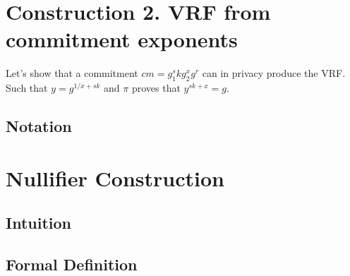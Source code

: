 \section{Construction 2. VRF from commitment exponents}

Let's show that a commitment $cm = g_1^sk g_2^x g^r$ can in privacy produce the VRF.
Such that $y = g^{1/x + sk}$ and $\pi$ proves that  $y^{sk + x} = g$.



















































\subsection{Notation}

\section{Nullifier Construction}
\subsection{Intuition}
% 

\subsection{Formal Definition}

